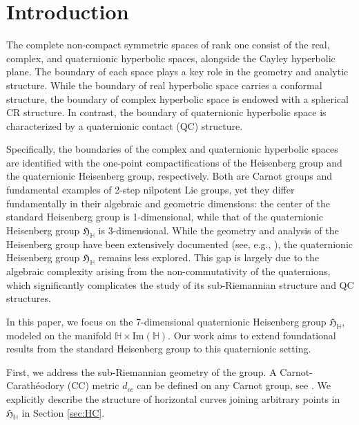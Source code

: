 \documentclass [12pt,a4paper]{amsart}
\newcommand{\mH}{\mathbb{H}}
\newcommand{\frakH}{\mathfrak{H}}
\theoremstyle{plain}
\theoremstyle{definition}
\numberwithin{equation}{section}
\begin{document}
\section{Introduction}

The complete non-compact symmetric spaces of rank one consist of the real, complex, and quaternionic hyperbolic spaces, alongside the Cayley hyperbolic plane. The boundary of each space plays a key role in the  geometry and analytic structure. While the boundary of real hyperbolic space carries a conformal structure, the boundary of complex hyperbolic space is endowed with a spherical CR structure. In contrast, the boundary of quaternionic hyperbolic space is characterized by a quaternionic contact (QC) structure.

Specifically, the boundaries of the complex and quaternionic hyperbolic spaces are identified with the one-point compactifications of the Heisenberg group and the quaternionic Heisenberg group, respectively. Both are Carnot groups and fundamental examples of 2-step nilpotent Lie groups, yet they differ fundamentally in their algebraic and geometric dimensions: the center of the standard Heisenberg group is 1-dimensional, while that of the quaternionic Heisenberg group $\frakH_\mH$ is 3-dimensional. While the geometry and analysis of the Heisenberg group have been extensively documented (see, e.g., \cite{CDPT, Fol, Mont}), the quaternionic Heisenberg group $\frakH_{\mathbb{H}}$ remains less explored. This gap is largely due to the algebraic complexity arising from the non-commutativity of the quaternions, which significantly complicates the study of its sub-Riemannian structure and QC structures.

In this paper, we focus on the 7-dimensional quaternionic Heisenberg group $\frakH_{\mathbb{H}}$, modeled on the manifold $\mathbb{H} \times \text{Im}(\mathbb{H})$. Our work aims to extend foundational results from the standard Heisenberg group to this quaternionic setting. 

First, we address the sub-Riemannian geometry of the group. A Carnot-Carath\'eodory (CC) metric $d_{cc}$ can be defined on any Carnot group, see \cite{BLU, Mit}. We explicitly describe the structure of horizontal curves joining arbitrary points in $\frakH_{\mathbb{H}}$ in Section \ref{sec:HC}. 
\end{document}

